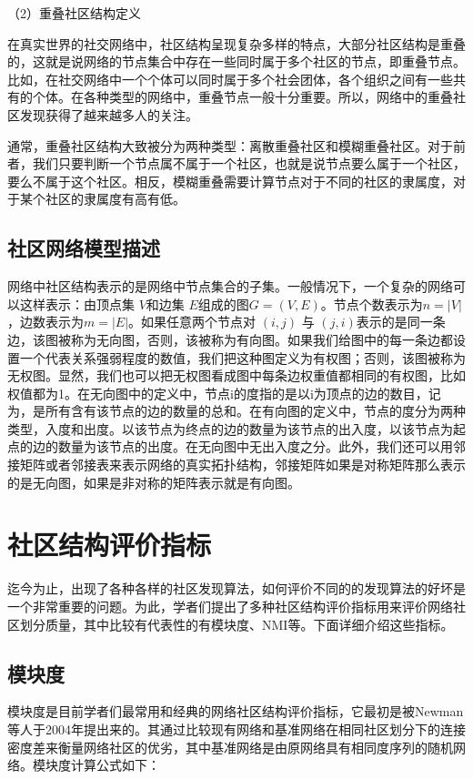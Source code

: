 （2）重叠社区结构定义

	在真实世界的社交网络中，社区结构呈现复杂多样的特点，大部分社区结构是重叠的，这就是说网络的节点集合中存在一些同时属于多个社区的节点，即重叠节点。比如，在社交网络中一个个体可以同时属于多个社会团体，各个组织之间有一些共有的个体。在各种类型的网络中，重叠节点一般十分重要。所以，网络中的重叠社区发现获得了越来越多人的关注。
  
  通常，重叠社区结构大致被分为两种类型：离散重叠社区和模糊重叠社区。对于前者，我们只要判断一个节点属不属于一个社区，也就是说节点要么属于一个社区，要么不属于这个社区。相反，模糊重叠需要计算节点对于不同的社区的隶属度，对于某个社区的隶属度有高有低。

\subsection{社区网络模型描述}

网络中社区结构表示的是网络中节点集合的子集。一般情况下，一个复杂的网络可以这样表示：由顶点集 $V$和边集 $E$组成的图$G=(V,E)$。节点个数表示为$n=|V|$，边数表示为$m=|E|$。如果任意两个节点对 $(i, j)$ 与 $(j, i)$表示的是同一条边，该图被称为无向图，否则，该被称为有向图。如果我们给图中的每一条边都设置一个代表关系强弱程度的数值，我们把这种图定义为有权图；否则，该图被称为无权图。显然，我们也可以把无权图看成图中每条边权重值都相同的有权图，比如权值都为1。在无向图中的定义中，节点i的度指的是以i为顶点的边的数目，记为，是所有含有该节点的边的数量的总和。在有向图的定义中，节点的度分为两种类型，入度和出度。以该节点为终点的边的数量为该节点的出入度，以该节点为起点的边的数量为该节点的出度。在无向图中无出入度之分。此外，我们还可以用邻接矩阵或者邻接表来表示网络的真实拓扑结构，邻接矩阵如果是对称矩阵那么表示的是无向图，如果是非对称的矩阵表示就是有向图。

\section{社区结构评价指标}

迄今为止，出现了各种各样的社区发现算法，如何评价不同的的发现算法的好坏是一个非常重要的问题。为此，学者们提出了多种社区结构评价指标用来评价网络社区划分质量，其中比较有代表性的有模块度、NMI等。下面详细介绍这些指标。

\subsection{模块度}

模块度是目前学者们最常用和经典的网络社区结构评价指标，它最初是被Newman等人于2004年提出来的\cite{2002Community}。其通过比较现有网络和基准网络在相同社区划分下的连接密度差来衡量网络社区的优劣，其中基准网络是由原网络具有相同度序列的随机网络。模块度计算公式如下：

